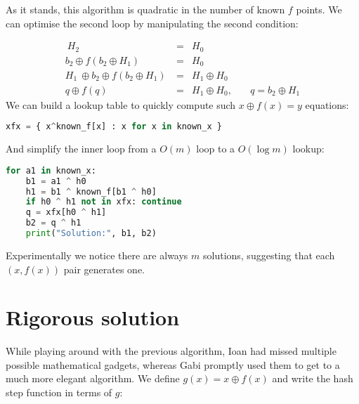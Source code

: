 \documentclass[11pt]{llncs}
\begin{document}
As it stands, this algorithm is quadratic in the number of known $f$ points. We can optimise the second loop by manipulating the second condition:

\[ \begin{aligned}
                 \                    H_2 &=& H_0 &\\
            b_2 \oplus f(b_2 \oplus H_1)\ &=& H_0 &\\
H_1\ \oplus b_2 \oplus f(b_2 \oplus H_1)\ &=& H_1 \oplus H_0 & \\
                            q \oplus f(q) &=& H_1 \oplus H_0,&\quad q=b_2 \oplus H_1
\end{aligned} \]
We can build a lookup table to quickly compute such $x\oplus f(x) = y$ equations:

\begin{lstlisting}[basicstyle=\ttfamily,language=Python,showstringspaces=false]
xfx = { x^known_f[x] : x for x in known_x }
\end{lstlisting}
And simplify the inner loop from a $O(m)$ loop to a $O(\log m)$ lookup:
\begin{lstlisting}[basicstyle=\ttfamily,language=Python,showstringspaces=false]
for a1 in known_x:
	b1 = a1 ^ h0
	h1 = b1 ^ known_f[b1 ^ h0]
	if h0 ^ h1 not in xfx: continue
	q = xfx[h0 ^ h1]
	b2 = q ^ h1
	print("Solution:", b1, b2)
\end{lstlisting}

Experimentally we notice there are always $m$ solutions, suggesting that each $(x,f(x))$ pair generates one.

\section{Rigorous solution}

While playing around with the previous algorithm, Ioan had missed multiple possible mathematical gadgets, whereas Gabi promptly used them to get to a much more elegant algorithm. We define $g(x) = x \oplus f(x)$ and write the hash step function in terms of $g$:
\end{document}
